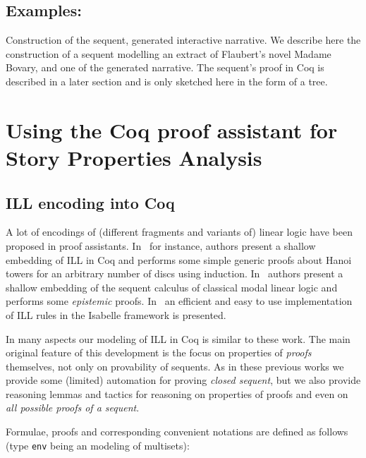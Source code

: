 \documentclass[runningheads,a4paper]{llncs}
\begin{document}
\subsection{Examples:} Construction of the sequent, generated interactive narrative.
We describe here the construction of a sequent modelling an extract of Flaubert's novel Madame Bovary, and one of the generated narrative. The sequent's proof in Coq is described in a later section and is only sketched here in the form of a tree.
\section{Using the Coq proof assistant for Story Properties Analysis}
\subsection{ILL encoding into Coq}

A lot of encodings of (different fragments and variants of) linear
logic have been proposed in proof assistants. In~\cite{Power99} for
instance, authors present a shallow embedding of ILL in Coq and
performs some simple generic proofs about Hanoi towers for an
arbitrary number of discs using induction.
In~\cite{Sadrzadeh03modallinear} authors present a shallow embedding
of the sequent calculus of classical modal linear logic and performs
some \emph{epistemic} proofs. In~\cite{Kalvala95mechanizinglinear} an
efficient and easy to use implementation of ILL rules in the Isabelle
framework is presented.

In many aspects our modeling of ILL in Coq is similar to these work.
The main original feature of this development is the focus on
properties of \emph{proofs} themselves, not only on provability of
sequents. As in these previous works we provide some (limited)
automation for proving \emph{closed sequent}, but we also provide reasoning lemmas and tactics
for reasoning on properties of proofs and even on \emph{all possible
  proofs of a sequent}. 

Formulae, proofs and corresponding convenient notations are defined as
follows (type \texttt{env} being an modeling of multisets):
\end{document}
